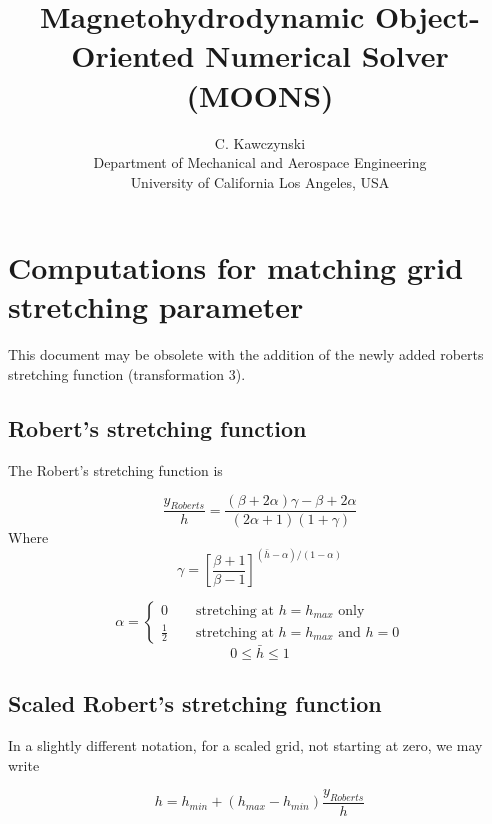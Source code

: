 \documentclass[11pt]{article}
\begin{document}
\doublespacing
\title{Magnetohydrodynamic Object-Oriented Numerical Solver (MOONS)}
\author{C. Kawczynski \\
Department of Mechanical and Aerospace Engineering \\
University of California Los Angeles, USA\\
}
\maketitle

\section{Computations for matching grid stretching parameter}

This document may be obsolete with the addition of the newly added roberts stretching function (transformation 3).

\subsection{Robert's stretching function}
The Robert's stretching function is

\begin{equation}
	\frac{y_{Roberts}}{h} = \frac{(\beta+2\alpha)\gamma - \beta + 2\alpha}{(2\alpha+1)(1+\gamma)}
\end{equation}
Where
\begin{equation}
	\gamma = \left[ 
	\frac{\beta+1}{\beta-1}
	\right]^{(\bar{h}-\alpha)/(1-\alpha)}
\end{equation}

\begin{equation}
	\alpha = 
	\begin{cases}
	0 \qquad \text{stretching at $h=h_{max}$ only}
	\\
	\frac{1}{2} \qquad \text{stretching at $h=h_{max}$ and $h=0$}
	\end{cases}
\end{equation}
\begin{equation}
	0 \le \bar{h} \le 1
\end{equation}


\subsection{Scaled Robert's stretching function}
In a slightly different notation, for a scaled grid, not starting at zero, we may write

\begin{equation}
	h = h_{min} + (h_{max}-h_{min}) \frac{y_{Roberts}}{h}
\end{equation}
\end{document}
